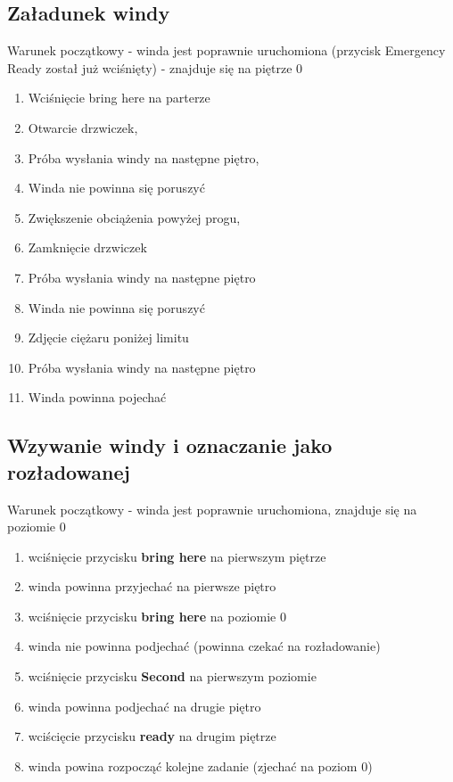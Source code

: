 \documentclass[a4paper,11pt]{article}
\begin{document}
	\subsection{Załadunek windy}
		Warunek początkowy - winda jest poprawnie uruchomiona (przycisk Emergency Ready został już wciśnięty) - znajduje się na piętrze 0
		\begin{enumerate}
			\item Wciśnięcie bring here na parterze
			\item Otwarcie drzwiczek,
			\item Próba wysłania windy na następne piętro,
			\item Winda nie powinna się poruszyć
			\item Zwiększenie obciążenia powyżej progu,
			\item Zamknięcie drzwiczek
			\item Próba wysłania windy na następne piętro 
			\item Winda nie powinna się poruszyć
			\item Zdjęcie ciężaru poniżej limitu
			\item Próba wysłania windy na następne piętro
			\item Winda powinna pojechać			
		\end{enumerate}
	\subsection{Wzywanie windy i oznaczanie jako rozładowanej} 
		Warunek początkowy - winda jest poprawnie uruchomiona, znajduje się na poziomie 0
		\begin{enumerate}
			\item wciśnięcie przycisku \textbf{bring here} na pierwszym piętrze
			\item winda powinna przyjechać na pierwsze piętro
			\item wciśnięcie przycisku \textbf{bring here} na poziomie 0
			\item winda nie powinna podjechać (powinna czekać na rozładowanie)
			\item wciśnięcie przycisku \textbf{Second} na pierwszym poziomie
			\item winda powinna podjechać na drugie piętro
			\item wciścięcie przycisku \textbf{ready} na drugim piętrze
			\item winda powina rozpocząć kolejne zadanie (zjechać na poziom 0)
		\end{enumerate}
		
\end{document}
